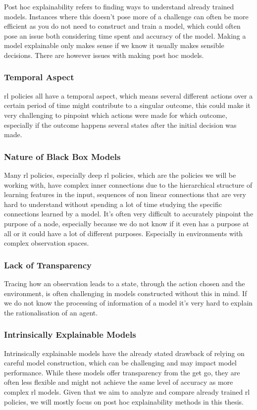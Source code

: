 \documentclass[UKenglish]{uiomasterthesis}
\begin{document}
Post hoc explainability refers to finding ways to understand already trained models. Instances where this doesn't pose more of a challenge can often be more efficient as you do not need to construct and train a model, which could often pose an issue both considering time spent and accuracy of the model. Making a model explainable only makes sense if we know it usually makes sensible decisions. There are however issues with making post hoc models.

\subsubsection{Temporal Aspect}
\ac{rl} policies all have a temporal aspect, which means several different actions over a certain period of time might contribute to a singular outcome, this could make it very challenging to pinpoint which actions were made for which outcome, especially if the outcome happens several states after the initial decision was made.

\subsubsection{Nature of Black Box Models}
Many \ac{rl} policies, especially deep \ac{rl} policies, which are the policies we will be working with, have complex inner connections due to the hierarchical structure of learning features in the input, sequences of non linear connections that are very hard to understand without spending a lot of time studying the specific connections learned by a model. It's often very difficult to accurately pinpoint the purpose of a node, especially because we do not know if it even has a purpose at all or it could have a lot of different purposes. Especially in environments with complex observation spaces.


\subsubsection{Lack of Transparency}
Tracing how an observation leads to a state, through the action chosen and the environment, is often challenging in models constructed without this in mind. If we do not know the processing of information of a model it's very hard to explain the rationalisation of an agent.

\subsubsection{Intrinsically Explainable Models}
Intrinsically explainable models have the already stated drawback of relying on careful model construction, which can be challenging and may impact model performance. While these models offer transparency from the get go, they are often less flexible and might not achieve the same level of accuracy as more complex \ac{rl} models. Given that we aim to analyze and compare already trained \ac{rl} policies, we will mostly focus on post hoc explainability methods in this thesis.
\end{document}

